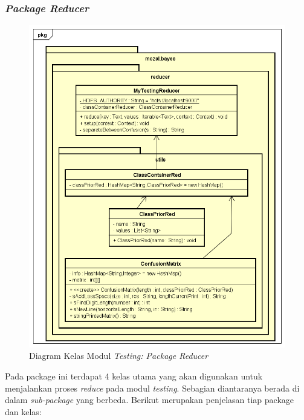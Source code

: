 \subsubsection{\textit{Package Reducer}}
\begin{figure}[H]
	\centering
	\includegraphics[scale=0.7]{ClassDiagramLengkap/CD_Test_Reducer}
	\caption[Diagram Kelas Modul \textit{Testing: Package Reducer}]{Diagram Kelas Modul \textit{Testing: Package Reducer}}
	\label{fig:Diagram Kelas Modul Testing: Package Reducer}
\end{figure}
Pada package ini terdapat 4 kelas utama yang akan digunakan untuk menjalankan proses \textit{reduce} pada modul \textit{testing}. Sebagian diantaranya berada di dalam \textit{sub-package} yang berbeda. Berikut merupakan penjelasan tiap package dan kelas:

